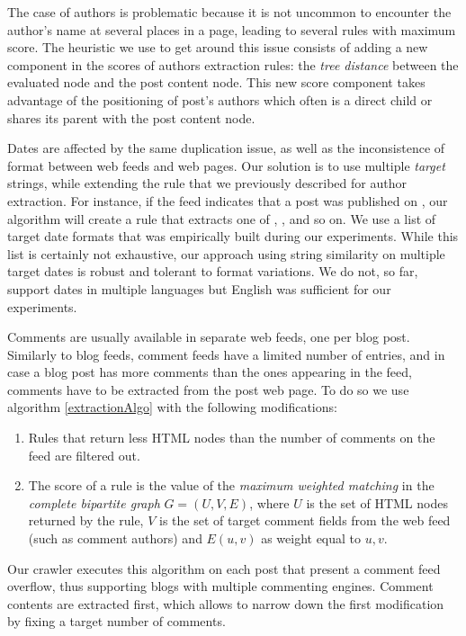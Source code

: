 The case of authors is problematic because it is not uncommon to encounter the author's name at several places in a page, leading to several rules with maximum score. The heuristic we use to get around this issue consists of adding a new component in the scores of authors extraction rules: the \emph{tree distance} between the evaluated node and the post content node. This new score component takes advantage of the positioning of post's authors which often is a direct child or shares its parent with the post content node.

Dates are affected by the same duplication issue, as well as the inconsistence of format between web feeds and web pages. Our solution is to use multiple \emph{target} strings, while extending the rule that we previously described for author extraction. For instance, if the feed indicates that a post was published on
, our algorithm will create a rule that extracts one of , ,  and so on. We use a list of  target date formats that was empirically built during our experiments. While this list is certainly not exhaustive, our approach using string similarity on multiple target dates is robust and tolerant to format variations. We do not, so far, support dates in multiple languages but English was sufficient for our experiments.

Comments are usually available in separate web feeds, one per blog post. Similarly to blog feeds, comment feeds have a limited number of entries, and in case a blog post has more comments than the ones appearing in the feed, comments have to be extracted from the post web page. To do so we use algorithm \ref{extractionAlgo} with the following modifications:
\begin{enumerate}
  \item Rules that return less HTML nodes than the number of comments on the feed are filtered out.
  \item The score of a rule is the value of the \emph{maximum weighted matching} in the \emph{complete bipartite graph} $G = (U, V, E)$, where $U$ is the set of HTML nodes returned by the rule, $V$ is the set of target comment fields from the web feed (such as comment authors) and $E(u, v)$ as weight equal to \code{\ref{similarityAlgo}(}$u, v$\code{)}.
\end{enumerate}
Our crawler executes this algorithm on each post that present a comment feed overflow, thus supporting blogs with multiple commenting engines. Comment contents are extracted first, which allows to narrow down the first modification by fixing a target number of comments.
